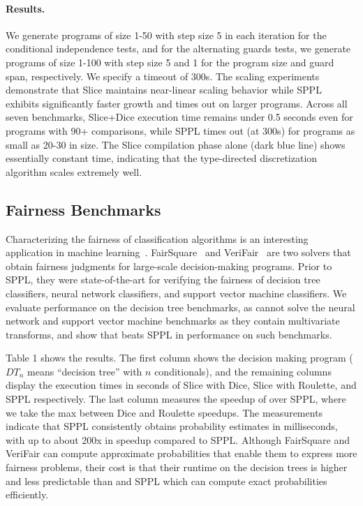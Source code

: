 

\paragraph{Results.} We generate programs of size 1-50 with step size 5 in each iteration for the conditional independence tests, and for the alternating guards tests, we generate programs of size 1-100 with step size 5 and 1 for the program size and guard span, respectively. We specify a timeout of 300s. The scaling experiments demonstrate that Slice maintains near-linear scaling behavior while SPPL exhibits significantly faster growth and times out on larger programs. Across all seven benchmarks, Slice+Dice execution time remains under 0.5 seconds even for programs with 90+ comparisons, while SPPL times out (at 300s) for programs as small as 20-30 in size. The Slice compilation phase alone (dark blue line) shows essentially constant time, indicating that the type-directed discretization algorithm scales extremely well.

\subsection{Fairness Benchmarks}\label{sec:fairness-benchmarks}
Characterizing the fairness of classification algorithms is an interesting application in machine learning~\cite{Dwork2012FairnessAwareness}. FairSquare~\cite{albarghouthi2017fairsquare} and VeriFair~\cite{Bastani2019VeriFair} are two solvers that obtain fairness judgments for large-scale decision-making programs. Prior to SPPL, they were state-of-the-art for verifying the fairness of decision tree classifiers, neural network classifiers, and support vector machine classifiers. We evaluate performance on the decision tree benchmarks, as \Slice cannot solve the neural network and support vector machine benchmarks as they contain multivariate transforms, and show that \Slice{} beats SPPL in performance on such benchmarks.

Table 1 shows the results. The first column shows the decision making program ($DT_n$ means ``decision tree'' with $n$ conditionals), and the remaining columns display the execution times in seconds of Slice with Dice, Slice with Roulette, and SPPL respectively. The last column measures the speedup of \Slice{} over SPPL, where we take the max between Dice and Roulette speedups. The measurements indicate that SPPL consistently obtains probability estimates in milliseconds, with up to about 200x in speedup compared to SPPL. Although FairSquare and VeriFair can compute approximate probabilities that enable them to express more fairness problems, their cost is that their runtime on the decision trees is higher and less predictable than \Slice{} and SPPL which can compute exact probabilities efficiently.


